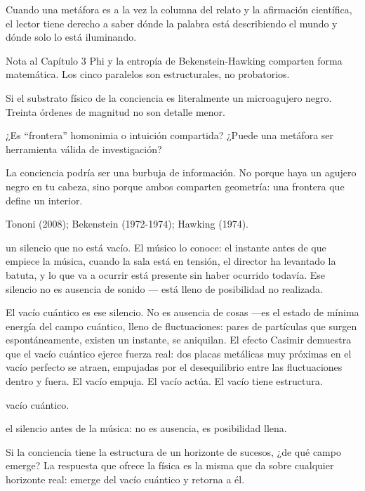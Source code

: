 Cuando una metáfora es a la vez la columna del relato y la afirmación científica, el lector tiene derecho a saber dónde la palabra está describiendo el mundo y dónde solo lo está iluminando.

\begin{notacap}{Nota al Capítulo 3}
 Phi y la entropía de Bekenstein-Hawking comparten forma matemática. Los cinco paralelos son estructurales, no probatorios.

 Si el substrato físico de la conciencia es literalmente un microagujero negro. Treinta órdenes de magnitud no son detalle menor.

 ¿Es “frontera” homonimia o intuición compartida? ¿Puede una metáfora ser herramienta válida de investigación?

 La conciencia podría ser una burbuja de información. No porque haya un agujero negro en tu cabeza, sino porque ambos comparten geometría: una frontera que define un interior.

 Tononi (2008); Bekenstein (1972-1974); Hawking (1974).
\end{notacap}
\noindent {} un silencio que no está vacío. El músico lo conoce: el instante antes de que empiece la música, cuando la sala está en tensión, el director ha levantado la batuta, y lo que va a ocurrir está presente sin haber ocurrido todavía. Ese silencio no es ausencia de sonido — está lleno de posibilidad no realizada.

El vacío cuántico es ese silencio. No es ausencia de cosas —es el estado de mínima energía del campo cuántico, lleno de fluctuaciones: pares de partículas que surgen espontáneamente, existen un instante, se aniquilan. El efecto Casimir demuestra que el vacío cuántico ejerce fuerza real: dos placas metálicas muy próximas en el vacío perfecto se atraen, empujadas por el desequilibrio entre las fluctuaciones dentro y fuera. El vacío empuja. El vacío actúa. El vacío tiene estructura.

\begin{fisica}
 vacío cuántico.

 el silencio antes de la música: no es ausencia, es posibilidad llena.
\end{fisica}
Si la conciencia tiene la estructura de un horizonte de sucesos, ¿de qué campo emerge? La respuesta que ofrece la física es la misma que da sobre cualquier horizonte real: emerge del vacío cuántico y retorna a él.

